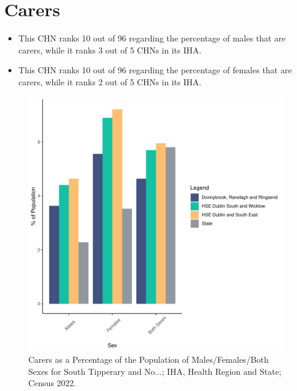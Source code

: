 \documentclass{article}
\begin{document}
\section{Carers}\label{sect:Carers}
\begin{itemize}
\item This CHN ranks  10 out of 96 regarding the percentage of males that are carers, while it ranks   3 out of 5 CHNs in its IHA.
\item This CHN ranks  10 out of 96 regarding the percentage of females that are carers, while it ranks   2 out of 5 CHNs in its IHA.
\end{itemize}
\begin{figure}[H]
	\centering
	\includegraphics[width = 150mm]{../figures/CareED.pdf}
	\caption{Carers as a Percentage of the Population of Males/Females/Both Sexes for South Tipperary and No...; IHA, Health Region and State; Census 2022.}
	\label{fig:2ae19629-1a6a-13a3-e055-000000000001}
	\end{figure}
\end{document}
